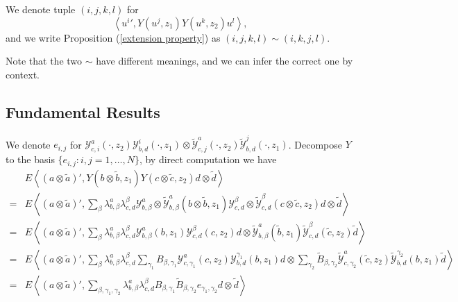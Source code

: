 \documentclass{article}
\begin{document}
We denote tuple $(i,j,k,l)$ for 
$$\left\langle {u^i}',Y(u^j,z_1)Y(u^k,z_2)u^l\right\rangle,$$
and we write Proposition (\ref{extension property}) as
$(i,j,k,l)\sim(i,k,j,l)$.

Note that the two $\sim$ have different meanings, 
and we can infer the correct one by context.

\subsection{Fundamental Results}
We denote $e_{i,j}$ for $\mathcal{Y}_{c,i}^a(\cdot,z_2)\mathcal{Y}_{b,d}^{i}(\cdot,z_1)\otimes \tilde{\mathcal{Y}}_{c,j}^a(\cdot,z_2)\tilde{\mathcal{Y}}_{b,d}^{j}(\cdot,z_1)$.
Decompose $Y$ to the basis $\{e_{i,j}:i,j=1,\ldots,N\}$,
by direct computation we have
$$
\begin{aligned}
&E\left\langle {(a\otimes \tilde{a})}',
Y(b\otimes \tilde{b},z_1)
Y(c\otimes \tilde{c},z_2)
d\otimes \tilde{d}\right\rangle\\
=&E\left\langle {(a\otimes \tilde{a})}',
\sum_{\beta}\lambda_{b,\beta}^a\lambda_{c,d}^{\beta}
\mathcal{Y}_{b,\beta}^a
\otimes\tilde{\mathcal{Y}}_{b,\beta}^a(b\otimes \tilde{b},z_1)
\mathcal{Y}_{c,d}^{\beta}
\otimes\tilde{\mathcal{Y}}_{c,d}^{\beta}(c\otimes \tilde{c},z_2)
d\otimes \tilde{d}\right\rangle\\
=&E\left\langle {(a\otimes \tilde{a})}',
\sum_{\beta}\lambda_{b,\beta}^a\lambda_{c,d}^{\beta}
\mathcal{Y}_{b,\beta}^a (b,z_1)
\mathcal{Y}_{c,d}^{\beta}(c,z_2)d
\otimes
\tilde{\mathcal{Y}}_{b,\beta}^{a}(\tilde{b},z_1)
\tilde{\mathcal{Y}}_{c,d}^{\beta}(\tilde{c},z_2)
\tilde{d}\right\rangle
\\
=&E\left\langle {(a\otimes \tilde{a})}',
\sum_{\beta}\lambda_{b,\beta}^a\lambda_{c,d}^{\beta}
\sum_{\gamma_1}B_{\beta,\gamma_1}
\mathcal{Y}_{c,\gamma_1}^a(c,z_2)\mathcal{Y}_{b,d}^{\gamma_1}(b,z_1)d
\otimes\sum_{\gamma_2}\tilde{B}_{\beta,\gamma_2}
\tilde{\mathcal{Y}}_{c,\gamma_2}^a(\tilde{c},z_2)\tilde{\mathcal{Y}}_{b,d}^{\gamma_2}(b,z_1)\tilde{d}
\right\rangle
\\
=&E\left\langle {(a\otimes \tilde{a})}',
\sum_{\beta,\gamma_1,\gamma_2}\lambda_{b,\beta}^a\lambda_{c,d}^{\beta}
B_{\beta,\gamma_1}\tilde{B}_{\beta,\gamma_2}
e_{\gamma_1,\gamma_2}d\otimes \tilde{d}\right\rangle
\end{aligned}
$$
\end{document}
